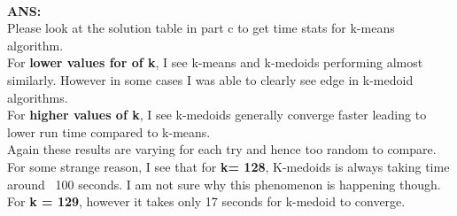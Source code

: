 \documentclass[twoside,10pt]{article}
\begin{document}
\begin{enumerate}
\\
\textbf{ANS:}\\
\hspace*{1cm} Please look at the solution table in part c to get time stats for k-means algorithm.\\
\hspace*{1cm} For \textbf{lower values for of k}, I see k-means and k-medoids performing almost similarly. However in some cases I was able to clearly see edge in k-medoid algorithms.\\
\hspace*{1cm} For \textbf{higher values of k}, I see k-medoids generally converge faster leading to lower run time compared to k-means.\\
\hspace*{1cm} Again these results are varying for each try and hence too random to compare.\\
\hspace*{1cm} For some strange reason, I see that for \textbf{k= 128}, K-medoids is always taking time around ~100 seconds. I am not sure why this phenomenon is happening though. For \textbf{k = 129}, however it takes only 17 seconds for k-medoid to converge.
\end{enumerate}
\end{document}
